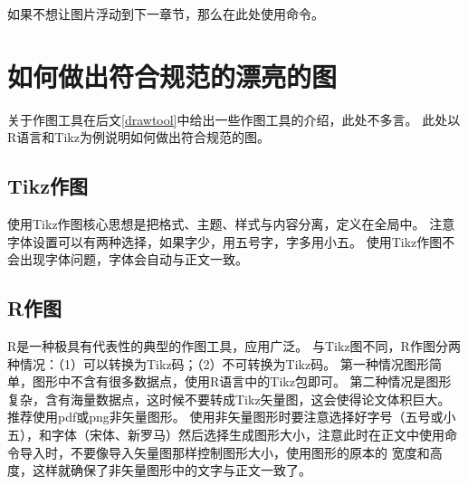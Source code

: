 \begin{figure}[!ht]
	\centering
	\begin{sideways}
		\begin{minipage}{\textheight}
			\centering
		\end{minipage}
	\end{sideways}
\end{figure}

\clearpage

如果不想让图片浮动到下一章节，那么在此处使用命令。

\section{如何做出符合规范的漂亮的图}

关于作图工具在后文\ref{drawtool}中给出一些作图工具的介绍，此处不多言。
此处以R语言和Tikz为例说明如何做出符合规范的图。

\subsection{Tikz作图}

使用Tikz作图核心思想是把格式、主题、样式与内容分离，定义在全局中。
注意字体设置可以有两种选择，如果字少，用五号字，字多用小五。
使用Tikz作图不会出现字体问题，字体会自动与正文一致。

\subsection{R作图}

R是一种极具有代表性的典型的作图工具，应用广泛。
与Tikz图不同，R作图分两种情况：（1）可以转换为Tikz码；（2）不可转换为Tikz码。
第一种情况图形简单，图形中不含有很多数据点，使用R语言中的Tikz包即可。
第二种情况是图形复杂，含有海量数据点，这时候不要转成Tikz矢量图，这会使得论文体积巨大。
推荐使用pdf或png非矢量图形。
使用非矢量图形时要注意选择好字号（五号或小五），和字体（宋体、新罗马）然后选择生成图形大小，注意此时在正文中使用命令导入时，不要像导入矢量图那样控制图形大小，使用图形的原本的
宽度和高度，这样就确保了非矢量图形中的文字与正文一致了。

